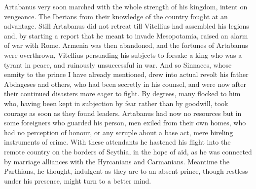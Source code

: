 
Artabanus very soon marched with the whole strength of his kingdom, intent on vengeance. The Iberians from their knowledge of the country fought at an advantage. Still Artabanus did not retreat till Vitellius had assembled his legions and, by starting a report that he meant to invade Mesopotamia, raised an alarm of war with Rome. Armenia was then abandoned, and the fortunes of Artabanus were overthrown, Vitellius persuading his subjects to forsake a king who was a tyrant in peace, and ruinously unsuccessful in war. And so Sinnaces, whose enmity to the prince I have already mentioned, drew into actual revolt his father Abdageses and others, who had been secretly in his counsel, and were now after their continued disasters more eager to fight. By degrees, many flocked to him who, having been kept in subjection by fear rather than by goodwill, took courage as soon as they found leaders. Artabanus had now no resources but in some foreigners who guarded his person, men exiled from their own homes, who had no perception of honour, or any scruple about a base act, mere hireling instruments of crime. With these attendants he hastened his flight into the remote country on the borders of Scythia, in the hope of aid, as he was connected by marriage alliances with the Hyrcanians and Carmanians. Meantime the Parthians, he thought, indulgent as they are to an absent prince, though restless under his presence, might turn to a better mind.


